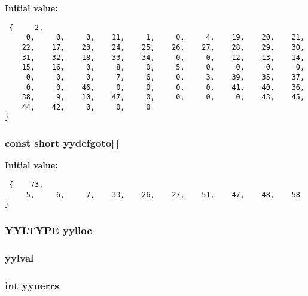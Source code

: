 {\bf Initial value:}

\footnotesize\begin{verbatim} {     2,
     0,     0,     0,    11,     1,     0,     4,    19,    20,    21,
    22,    17,    23,    24,    25,    26,    27,    28,    29,    30,
    31,    32,    18,    33,    34,     0,     0,    12,    13,    14,
    15,    16,     0,     8,     0,     5,     0,     0,     0,     0,
     0,     0,     0,     7,     6,     0,     3,    39,    35,    37,
     0,     0,    46,     0,     0,     0,     0,    41,    40,    36,
    38,     9,    10,    47,     0,     0,     0,     0,    43,    45,
    44,    42,     0,     0,     0
}\end{verbatim}\normalsize 
{}
\subsubsection{\setlength{\rightskip}{0pt plus 5cm}const short yydefgoto[$\,$]\hspace{0.3cm}{\tt  [static]}}\label{vcd__parser_8c_a91}


{\bf Initial value:}

\footnotesize\begin{verbatim} {    73,
     5,     6,     7,    33,    26,    27,    51,    47,    48,    58
}\end{verbatim}\normalsize 
{}
\subsubsection{\setlength{\rightskip}{0pt plus 5cm}YYLTYPE yylloc}\label{vcd__parser_8c_a98}


\subsubsection{ yylval}\label{vcd__parser_8c_a97}


\subsubsection{\setlength{\rightskip}{0pt plus 5cm}int yynerrs}\label{vcd__parser_8c_a99}


